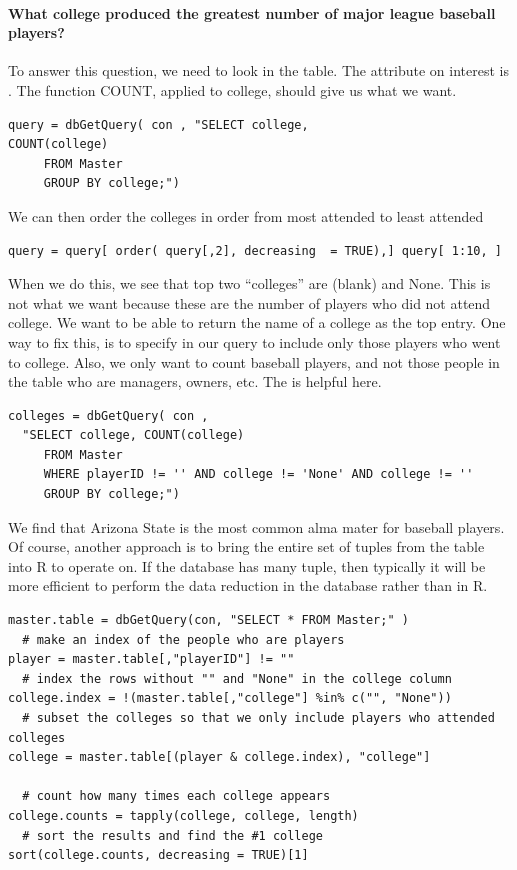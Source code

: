 \paragraph{What college produced the greatest number of major league baseball players?}
To answer this question, we need to look in  the 
 table.  The attribute on interest is . 
The function COUNT, applied to college, should give us what we want. 

\begin{verbatim}
query = dbGetQuery( con , "SELECT college,    
COUNT(college) 
     FROM Master 
     GROUP BY college;") 
\end{verbatim}

We can then order the colleges in order from most attended to least attended 
\begin{verbatim}
query = query[ order( query[,2], decreasing  = TRUE),] query[ 1:10, ]
\end{verbatim}

When we do this, we see that 
top two ``colleges'' are (blank) and None.  This is not what we want because 
these are the number of players who did not attend college.  
We want to be able to return the name of a college as the top entry.  
One way to fix this, is to specify in our query to  include only those
players who went to college. 
Also, we only want to count baseball players, and not those people in the 
 table who are managers, owners, etc. The 
is helpful here. 

\begin{verbatim}
colleges = dbGetQuery( con , 
  "SELECT college, COUNT(college) 
     FROM Master 
     WHERE playerID != '' AND college != 'None' AND college != '' 
     GROUP BY college;")
\end{verbatim}

We find that Arizona State is the most common alma mater for baseball players.
Of course, another approach is to bring the entire set of tuples from the
 table into R to operate on. 
If the database has many tuple, then typically it will be more efficient to
perform the data reduction in the database rather than in R.

\begin{verbatim}
master.table = dbGetQuery(con, "SELECT * FROM Master;" )
  # make an index of the people who are players
player = master.table[,"playerID"] != ""
  # index the rows without "" and "None" in the college column
college.index = !(master.table[,"college"] %in% c("", "None"))
  # subset the colleges so that we only include players who attended colleges
college = master.table[(player & college.index), "college"]

  # count how many times each college appears
college.counts = tapply(college, college, length)
  # sort the results and find the #1 college 
sort(college.counts, decreasing = TRUE)[1]
\end{verbatim}


